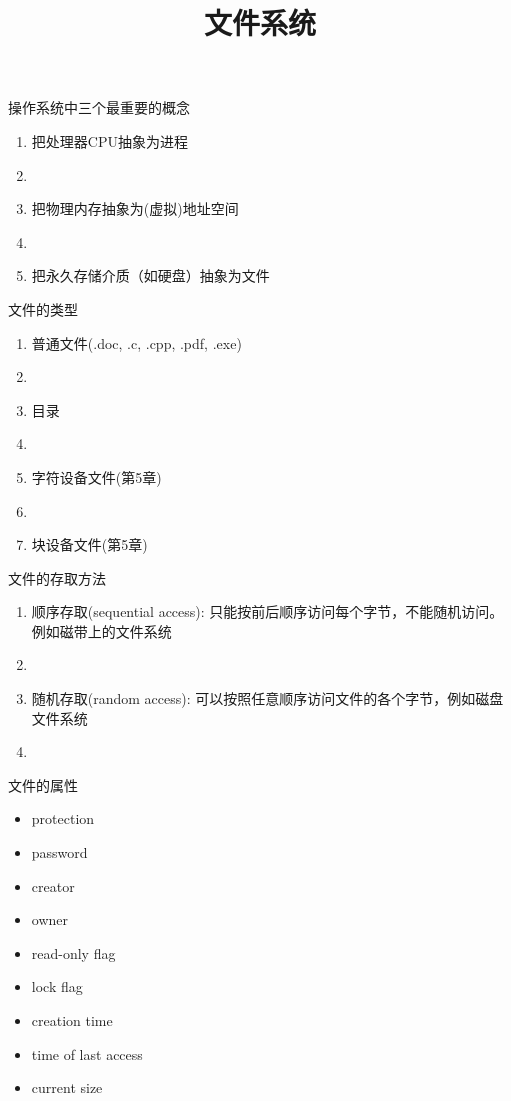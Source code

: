 \documentclass[xcolor=svgnames]{beamer}
\begin{document}
\begin{CJK*}{UTF8}{gbsn}


\title{文件系统}

\begin{frame}
\maketitle
\end{frame}


\begin{frame}{操作系统中三个最重要的概念}
\begin{enumerate}
\item 把处理器CPU抽象为\alert{进程}
\item[]
\item 把物理内存抽象为(虚拟)\alert{地址空间}
\item[]
\item 把永久存储介质（如硬盘）抽象为\alert{文件}
\end{enumerate}
\end{frame}


\begin{frame}{文件的类型}
\begin{enumerate}
\item 普通文件(.doc, .c, .cpp, .pdf, .exe)
\item[]
\item 目录
\item[]
\item 字符设备文件(第5章)
\item[]
\item 块设备文件(第5章)
\end{enumerate}
\end{frame}

\begin{frame}{文件的存取方法}
\begin{enumerate}
\item 顺序存取(sequential access): 只能按前后顺序访问每个字节，不能随机访问。例如磁带上的文件系统
\item[]
\item 随机存取(random access): 可以按照任意顺序访问文件的各个字节，例如磁盘文件系统
\item[]
\end{enumerate}
\end{frame}

\begin{frame}{文件的属性}
\begin{itemize}
\item protection
\item password
\item creator
\item owner
\item read-only flag
\item lock flag
\item creation time
\item time of last access
\item current size
\end{itemize}
\end{frame}


\end{CJK*}
\end{document}
